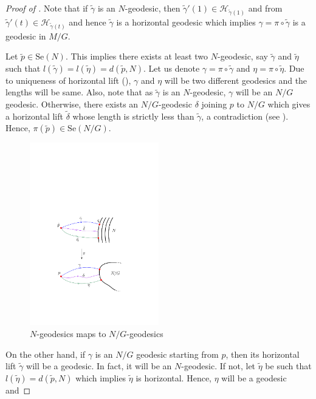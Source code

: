 \begin{proof}[Proof of ]
	Note that if $\tilde{\gamma}$ is an $N$-geodesic, then $\tilde{\gamma}'(1)\in \mathcal{H}_{\tilde{\gamma}(1)}$ and from  $\tilde{\gamma}'(t)\in \mathcal{H}_{\tilde{\gamma}(t)}$ and hence $\tilde{\gamma}$ is a horizontal geodesic which implies $\gamma=\pi\circ \tilde{\gamma}$ is a geodesic in $M/G$.

	\hf Let $\tilde{p}\in \mathrm{Se}(N)$. This implies there exists at least two $N$-geodesic, say $\tilde{\gamma}$ and $\tilde{\eta}$ such that $l(\tilde{\gamma})=l(\tilde{\eta})=d(\tilde{p},N)$. Let us denote $\gamma=\pi\circ \tilde{\gamma}$ and $\eta = \pi\circ\tilde{\eta}$. Due to uniqueness of horizontal lift (), $\gamma$ and $\eta$ will be two different geodesics and the lengths will be same. Also, note that as $\tilde{\gamma}$ is an $N$-geodesic, $\gamma$ will be an $N/G$ geodesic. Otherwise, there exists an $N/G$-geodesic $\delta$ joining $p$ to $N/G$ which gives a horizontal lift $\tilde{\delta}$ whose length is strictly less than $\tilde{\gamma}$, a contradiction (see ). Hence, $\pi(\tilde{p})\in \mathrm{Se} (N/G)$. 
	\begin{figure}[!htb]
		\centering
		\includegraphics[width=0.5\textwidth]{figures/proof_of_the_main_theorem-one-side.pdf}
		\caption{$N$-geodesics maps to $N/G$-geodesics}
		\label{fig:Se(N)/G-subset-Se(N/G)}
	\end{figure}
	On the other hand, if $\gamma$ is an $N/G$ geodesic starting from $p$, then its horizontal lift $\tilde{\gamma}$ will be a geodesic. In fact, it will be an $N$-geodesic. If not, let $\tilde{\eta}$ be such that $l \left(\tilde{\eta}\right)=d \left(\tilde{p},N\right)$ which implies $\tilde{\eta}$ is horizontal. Hence, $\eta$ will be a geodesic and 

\end{proof}
